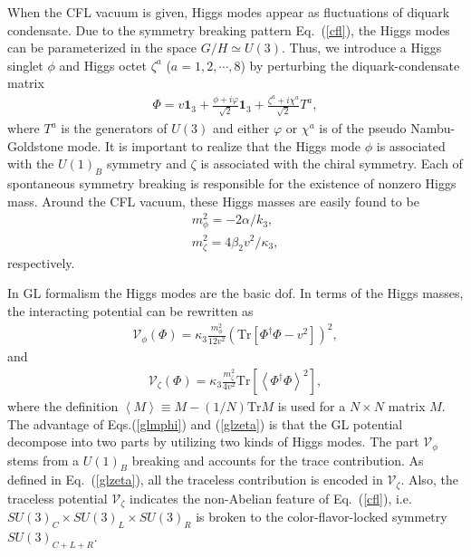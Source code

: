 \documentclass[12pt]{article}
\begin{document}
When the CFL vacuum is given, Higgs modes appear as fluctuations of diquark condensate.
Due to the symmetry breaking pattern Eq.~(\ref{cfl}), the Higgs modes can be parameterized in the space $G/H \simeq U(3)$.
Thus, we introduce a Higgs singlet $\phi$ and Higgs octet $\zeta^a$ ($a = 1, 2, \cdots, 8$) by perturbing the diquark-condensate matrix
\begin{eqnarray}
\Phi=v\textbf{1}_3+\frac{\phi+i\varphi}{\sqrt{2}}\textbf{1}_3+\frac{\zeta^a+i\chi^a}{\sqrt{2}}T^a,
\label{pert}
\end{eqnarray}
where $T^a$ is the generators of $U(3)$ and either $\varphi$ or $\chi^a$ is of the pseudo Nambu-Goldstone mode.
It is important to realize that the Higgs mode $\phi$ is associated with the $U(1)_B$ symmetry and $\zeta$ is associated
with the chiral symmetry. 
Each of spontaneous symmetry breaking is responsible for the existence of nonzero Higgs mass.
Around the CFL vacuum, these Higgs masses are easily found to be
\begin{eqnarray}
m_\phi^2={-2\alpha}/{k_3},\\ m_\zeta^2={4\beta_2 v^2}/{\kappa_3}	,\label{mhiggs}
\end{eqnarray}
respectively.

In GL formalism the Higgs modes are the basic dof. In terms of the Higgs masses,
the interacting potential can be rewritten as
\begin{eqnarray}
\mathcal{V}_\phi (\Phi)=
\kappa_3\frac{m_\phi^2}{12v^2}(\text{Tr}[\Phi^\dagger\Phi-v^2])^2,
\label{glmphi}
\end{eqnarray}
and
\begin{eqnarray}
\mathcal{V}_\zeta (\Phi)=
\kappa_3\frac{m_\zeta^2}{4v^2}\text{Tr}\left[\left<\Phi^\dagger\Phi\right>^2\right],
\label{glzeta}
\end{eqnarray}
where the definition $\left<M\right>\equiv M-(1/N)\text{Tr}M$ is used for a $N\times N$ matrix $M$.
The advantage of Eqs.(\ref{glmphi}) and (\ref{glzeta})
is that the GL potential decompose into two parts by utilizing two kinds of Higgs modes. The part $\mathcal{V}_\phi$
stems from a $U(1)_B$ breaking and accounts for the trace contribution. As defined in Eq.~(\ref{glzeta}), all the
traceless contribution is encoded in $\mathcal{V}_\zeta$.
Also, the traceless potential $\mathcal{V}_\zeta$ indicates the non-Abelian feature of Eq.~(\ref{cfl}), i.e. $SU(3)_{C}\times SU(3)_{L}\times SU(3)_{R}$ is broken to the color-flavor-locked symmetry $SU(3)_{C+L+R}$.
\end{document}
